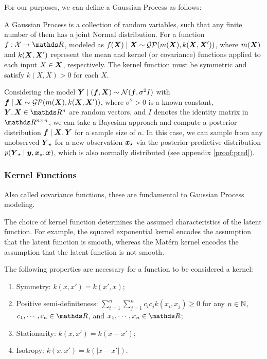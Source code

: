 For our purposes, we can define a Gaussian Process as follows:
\begin{defi}
\label{def:gp}
    A Gaussian Process is a collection of random variables, such that any finite number of them has a joint Normal distribution.
    For a function \( f: \cX \to \bR \), modeled as \( f(\boldsymbol{X}) \mid \boldsymbol{X} \sim \mathcal{GP}(m(\boldsymbol{X}), k(\boldsymbol{X}, \boldsymbol{X}')) \), where \( m(\boldsymbol{X}) \) and \( k(\boldsymbol{X}, \boldsymbol{X}') \) represent the mean and kernel (or covariance) functions applied to each input \( X \in \boldsymbol{X} \), respectively.
    The kernel function must be symmetric and satisfy \( k(X, X) > 0 \) for each \( X \). 
\end{defi}

Considering the model \( \boldsymbol{Y} \mid (\boldsymbol{f}, \boldsymbol{X}) \sim \mathcal{N}(\boldsymbol{f}, \sigma^2 I) \) with \( \boldsymbol{f} \mid \boldsymbol{X} \sim \mathcal{GP}(m(\boldsymbol{X}), k(\boldsymbol{X}, \boldsymbol{X}')) \), where \( \sigma^2 > 0 \) is a known constant, \( \bfY, \bfX \in \bR^n \) are random vectors, and \( I \) denotes the identity matrix in \( \bR^{n \times n} \), we can take a Bayesian approach and compute a posterior distribution \( \boldsymbol{f} \mid \boldsymbol{X}, \boldsymbol{Y} \) for a sample size of \( n \).
In this case, we can sample from any unobserved \( \boldsymbol{Y}_\star \) for a new observation \( \boldsymbol{x}_\star \) via the posterior predictive distribution \( p(\boldsymbol{Y}_\star \mid \boldsymbol{y}, \boldsymbol{x}_\star, \boldsymbol{x}) \), which is also normally distributed (see appendix \ref{proof:pred}).

\subsubsection{Kernel Functions}

Also called covariance functions, these are fundamental to Gaussian Process modeling.

The choice of kernel function determines the assumed characteristics of the latent function. For example, the squared exponential kernel encodes the assumption that the latent function is smooth, whereas the Matérn kernel encodes the assumption that the latent function is not smooth.

The following properties are necessary for a function to be considered a kernel:

\begin{enumerate}
\item Symmetry: \( k(x, x') = k(x', x) \);
\item Positive semi-definiteness: \( \sum_{i=1}^n \sum_{j=1}^n c_i c_j k(x_i, x_j) \geq 0 \) for any \( n \in \mathbb{N} \), \( c_1, \cdots, c_n \in \bR \), and \( x_1, \cdots, x_n \in \bR \);
\item Stationarity: \( k(x, x') = k(x - x') \);
\item Isotropy: \( k(x, x') = k(|x - x'|) \).
\end{enumerate}

